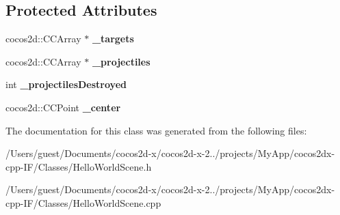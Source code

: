 \subsection*{Protected Attributes}
\begin{DoxyCompactItemize}
\item 
\hypertarget{class_hello_world_a8b2703132f8c9c0bb322ac1df9879720}{cocos2d\-::\-C\-C\-Array $\ast$ {\bfseries \-\_\-targets}}\label{class_hello_world_a8b2703132f8c9c0bb322ac1df9879720}

\item 
\hypertarget{class_hello_world_a996822e94afb4b5bbcacd47a60cab481}{cocos2d\-::\-C\-C\-Array $\ast$ {\bfseries \-\_\-projectiles}}\label{class_hello_world_a996822e94afb4b5bbcacd47a60cab481}

\item 
\hypertarget{class_hello_world_a6b2e87ba7e7f6608a9a125b59a736f1e}{int {\bfseries \-\_\-projectiles\-Destroyed}}\label{class_hello_world_a6b2e87ba7e7f6608a9a125b59a736f1e}

\item 
\hypertarget{class_hello_world_aaef87dbbdc450e41ffd6fc777c0f321b}{cocos2d\-::\-C\-C\-Point {\bfseries \-\_\-center}}\label{class_hello_world_aaef87dbbdc450e41ffd6fc777c0f321b}

\end{DoxyCompactItemize}


The documentation for this class was generated from the following files\-:\begin{DoxyCompactItemize}
\item 
/\-Users/guest/\-Documents/cocos2d-\/x/cocos2d-\/x-\/2../projects/\-My\-App/cocos2dx-\/cpp-\/\-I\-F/\-Classes/Hello\-World\-Scene.\-h\item 
/\-Users/guest/\-Documents/cocos2d-\/x/cocos2d-\/x-\/2../projects/\-My\-App/cocos2dx-\/cpp-\/\-I\-F/\-Classes/Hello\-World\-Scene.\-cpp\end{DoxyCompactItemize}
